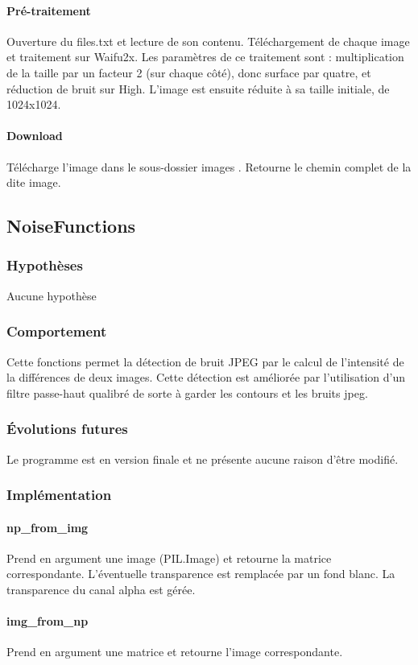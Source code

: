 \documentclass[a4paper,12pt]{article}
\begin{document}
\paragraph{Pré-traitement}
Ouverture du files.txt et lecture de son contenu. Téléchargement de chaque image et traitement sur Waifu2x. Les paramètres de ce traitement sont : multiplication de la taille par un facteur 2 (sur chaque côté), donc surface par quatre, et réduction de bruit sur High.
L'image est ensuite réduite à sa taille initiale, de 1024x1024.
\paragraph{Download}
Télécharge l'image dans le sous-dossier \og images \fg. Retourne le chemin complet de la dite image. 

\subsection{NoiseFunctions}
\subsubsection{Hypothèses}
Aucune hypothèse
\subsubsection{Comportement}
Cette fonctions permet la détection de bruit JPEG par le calcul de l'intensité de la différences de deux images. Cette détection est améliorée par l'utilisation d'un filtre passe-haut qualibré de sorte à garder les contours et les bruits jpeg.
\subsubsection{Évolutions futures}
Le programme est en version finale et ne présente aucune raison d'être modifié.
\subsubsection{Implémentation}
\paragraph{np\_from\_img}
Prend en argument une image (PIL.Image) et retourne la matrice correspondante. L'éventuelle transparence est remplacée par un fond blanc. La transparence du canal alpha est gérée.

\paragraph{img\_from\_np}
Prend en argument une matrice et retourne l'image correspondante.
\end{document}
